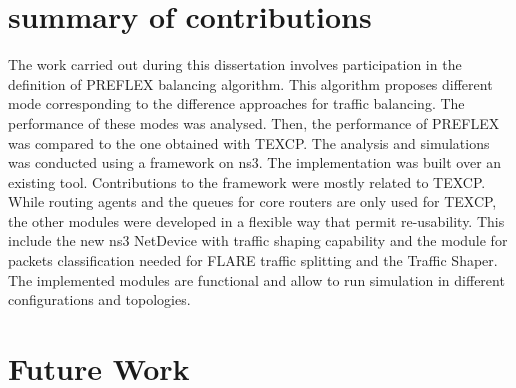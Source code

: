 \section{summary of contributions}
The work carried out during this dissertation involves participation in the definition of PREFLEX balancing algorithm. This algorithm proposes different  mode corresponding to the difference approaches for traffic balancing. The performance of these modes was analysed. Then, the performance of PREFLEX was compared to the one obtained with TEXCP. 
The analysis and simulations was conducted using a framework on ns3. The implementation was built over an existing tool. Contributions to the framework were mostly related to TEXCP. While routing agents and the queues for  core routers are only used for TEXCP, the other modules were developed in a flexible way that permit re-usability. This include the new ns3 NetDevice with traffic shaping capability and the module for packets classification needed for FLARE traffic splitting and the Traffic Shaper.  The implemented modules are functional and allow to run simulation in different configurations and topologies. 
\section{Future Work}
